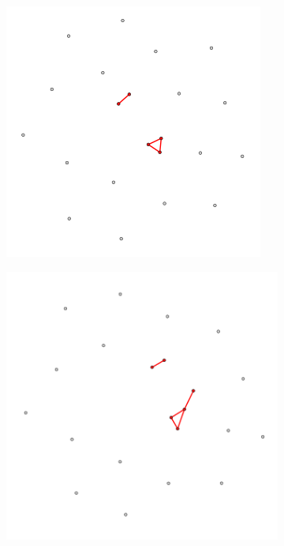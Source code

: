 \begin{figure}
\begin{subfigure}{0.3\textwidth}
        \caption{}
        \label{fig:temporal net B}
    \end{subfigure}
    \hfill
    \begin{subfigure}{0.3\textwidth}
        \centering
        \includegraphics[width=\textwidth]{figures/temporal/2.png}
        \caption{}
        \label{fig:temporal net C}
    \end{subfigure}
    \hfill
    \begin{subfigure}{0.3\textwidth}
        \centering
        \includegraphics[width=\textwidth]{figures/temporal/3.png}

\end{subfigure}
\end{figure}
